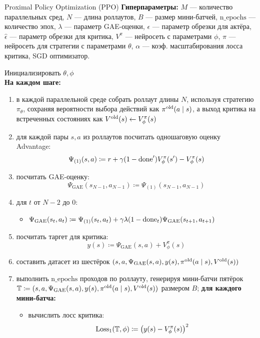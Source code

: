 \begin{algorithm}[label = PPOalgorithm]{Proximal Policy Optimization (PPO)}
\textbf{Гиперпараметры:} $M$ --- количество параллельных сред, $N$ --- длина роллаутов, $B$ --- размер мини-батчей, $\mathrm{n\_epochs}$ --- количество эпох, $\lambda$ --- параметр GAE-оценки, $\epsilon$ --- параметр обрезки для актёра, $\hat{\epsilon}$ --- параметр обрезки для критика, $V^\pi$ --- нейросеть с параметрами $\phi$, $\pi$ --- нейросеть для стратегии с параметрами $\theta$, $\alpha$ --- коэф. масштабирования лосса критика, SGD оптимизатор.

\vspace{0.3cm}
Инициализировать $\theta, \phi$ \\
\textbf{На каждом шаге:}
\begin{enumerate}
    \item в каждой параллельной среде собрать роллаут длины $N$, используя стратегию $\pi_{\theta}$, сохраняя вероятности выбора действий как $\pi^{\mathrm{old}}(a \mid s)$, а выход критика на встреченных состояниях как $V^{\mathrm{old}}(s) \leftarrow V^{\pi}_{\phi}(s)$
    \item для каждой пары $s, a$ из роллаутов посчитать одношаговую оценку Advantage:
    $$\Psi_{(1)}(s, a) \coloneqq r + \gamma (1 - \mathrm{done}') V^\pi_{\phi}(s') - V^\pi_{\phi}(s)$$
    \item посчитать GAE-оценку:
    $$\Psi_{\mathrm{GAE}}(s_{N-1}, a_{N-1}) \coloneqq \Psi_{(1)}(s_{N-1}, a_{N-1})$$
    \item для $t$ от $N - 2$ до 0:
    \begin{itemize}
    \item $\Psi_{\mathrm{GAE}}(s_t, a_t) \coloneqq \Psi_{(1)}(s_t, a_t) + \gamma \lambda (1 - \mathrm{done}_t) \Psi_{\mathrm{GAE}}(s_{t+1}, a_{t+1})$
    \end{itemize}
    \item посчитать таргет для критика:
    $$y(s) \coloneqq \Psi_{\mathrm{GAE}}(s, a) + V^\pi_{\phi}(s)$$
    \item составить датасет из шестёрок $(s, a, \Psi_{\mathrm{GAE}}(s, a), y(s), \pi^{\mathrm{old}}(a \mid s), V^{\mathrm{old}}(s))$
    \item выполнить $\mathrm{n\_epochs}$ проходов по роллауту, генерируя мини-батчи пятёрок $\mathbb{T} \coloneqq (s, a, \Psi_{\mathrm{GAE}}(s, a), y(s), \pi^{\mathrm{old}}(a \mid s), V^{\mathrm{old}}(s))$ размером $B$; \textbf{для каждого мини-батча:}
    \begin{itemize}
    \item вычислить лосс критика:
    $$\operatorname{Loss}_1(\mathbb{T}, \phi) \coloneqq \left( y(s) - V^\pi_\phi(s) \right) ^2$$

\end{itemize}
\end{enumerate}
\end{algorithm}
